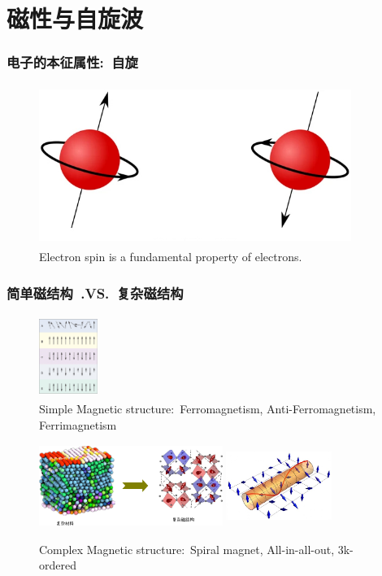 {\section{磁性与自旋波}
\frame
{
	\frametitle{电子的本征属性:~自旋}
\begin{figure}[h!]
\vspace*{-0.08in}
\centering
\includegraphics[height=2.05in,width=4.00in,viewport=0 0 580 290,clip]{Figures/electron-spin_2.jpeg}
\caption{\tiny \textrm{Electron spin is a fundamental property of electrons.}}%
\label{Fig:Electron-spin}
\end{figure}
}

\frame
{
	\frametitle{简单磁结构~\textrm{.VS.}~复杂磁结构}
\begin{figure}[h!]
\vspace*{-0.08in}
\centering
\includegraphics[height=1.05in,width=0.75in]{Figures/Magnet-simple.png}
\caption{\tiny \textrm{Simple Magnetic structure:~Ferromagnetism, Anti-Ferromagnetism, Ferrimagnetism}}%
\label{Fig:Simple-Magnet}
\end{figure}
\begin{figure}[h!]
\vspace*{-0.08in}
\centering
\includegraphics[height=1.05in,width=2.35in]{Figures/Magnet-complex-compound.png}
\hskip 0.5pt
\includegraphics[height=1.05in,width=1.35in]{Figures/Magnet-complex.png}
\caption{\tiny \textrm{Complex Magnetic structure:~Spiral magnet, All-in-all-out, 3k-ordered}}%
\label{Fig:Complex-Magnet}
\end{figure}
}

}
